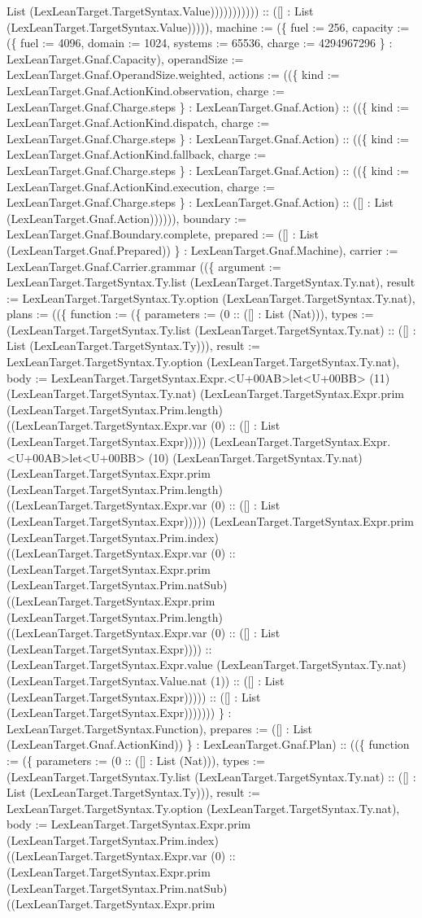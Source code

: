 \documentclass[11pt]{article}
\begin{document}
List (LexLeanTarget.TargetSyntax.Value))))))))))) :: ([] : List (LexLeanTarget.TargetSyntax.Value))))), machine := (\{ fuel := 256, capacity := (\{ fuel := 4096, domain := 1024, systems := 65536, charge := 4294967296 \} : LexLeanTarget.Gnaf.Capacity), operandSize := LexLeanTarget.Gnaf.OperandSize.weighted, actions := ((\{ kind := LexLeanTarget.Gnaf.ActionKind.observation, charge := LexLeanTarget.Gnaf.Charge.steps \} : LexLeanTarget.Gnaf.Action) :: ((\{ kind := LexLeanTarget.Gnaf.ActionKind.dispatch, charge := LexLeanTarget.Gnaf.Charge.steps \} : LexLeanTarget.Gnaf.Action) :: ((\{ kind := LexLeanTarget.Gnaf.ActionKind.fallback, charge := LexLeanTarget.Gnaf.Charge.steps \} : LexLeanTarget.Gnaf.Action) :: ((\{ kind := LexLeanTarget.Gnaf.ActionKind.execution, charge := LexLeanTarget.Gnaf.Charge.steps \} : LexLeanTarget.Gnaf.Action) :: ([] : List (LexLeanTarget.Gnaf.Action)))))), boundary := LexLeanTarget.Gnaf.Boundary.complete, prepared := ([] : List (LexLeanTarget.Gnaf.Prepared)) \} : LexLeanTarget.Gnaf.Machine), carrier := LexLeanTarget.Gnaf.Carrier.grammar ((\{ argument := LexLeanTarget.TargetSyntax.Ty.list (LexLeanTarget.TargetSyntax.Ty.nat), result := LexLeanTarget.TargetSyntax.Ty.option (LexLeanTarget.TargetSyntax.Ty.nat), plans := ((\{ function := (\{ parameters := (0 :: ([] : List (Nat))), types := (LexLeanTarget.TargetSyntax.Ty.list (LexLeanTarget.TargetSyntax.Ty.nat) :: ([] : List (LexLeanTarget.TargetSyntax.Ty))), result := LexLeanTarget.TargetSyntax.Ty.option (LexLeanTarget.TargetSyntax.Ty.nat), body := LexLeanTarget.TargetSyntax.Expr.<U+00AB>let<U+00BB> (11) (LexLeanTarget.TargetSyntax.Ty.nat) (LexLeanTarget.TargetSyntax.Expr.prim (LexLeanTarget.TargetSyntax.Prim.length) ((LexLeanTarget.TargetSyntax.Expr.var (0) :: ([] : List (LexLeanTarget.TargetSyntax.Expr))))) (LexLeanTarget.TargetSyntax.Expr.<U+00AB>let<U+00BB> (10) (LexLeanTarget.TargetSyntax.Ty.nat) (LexLeanTarget.TargetSyntax.Expr.prim (LexLeanTarget.TargetSyntax.Prim.length) ((LexLeanTarget.TargetSyntax.Expr.var (0) :: ([] : List (LexLeanTarget.TargetSyntax.Expr))))) (LexLeanTarget.TargetSyntax.Expr.prim (LexLeanTarget.TargetSyntax.Prim.index) ((LexLeanTarget.TargetSyntax.Expr.var (0) :: (LexLeanTarget.TargetSyntax.Expr.prim (LexLeanTarget.TargetSyntax.Prim.natSub) ((LexLeanTarget.TargetSyntax.Expr.prim (LexLeanTarget.TargetSyntax.Prim.length) ((LexLeanTarget.TargetSyntax.Expr.var (0) :: ([] : List (LexLeanTarget.TargetSyntax.Expr)))) :: (LexLeanTarget.TargetSyntax.Expr.value (LexLeanTarget.TargetSyntax.Ty.nat) (LexLeanTarget.TargetSyntax.Value.nat (1)) :: ([] : List (LexLeanTarget.TargetSyntax.Expr))))) :: ([] : List (LexLeanTarget.TargetSyntax.Expr))))))) \} : LexLeanTarget.TargetSyntax.Function), prepares := ([] : List (LexLeanTarget.Gnaf.ActionKind)) \} : LexLeanTarget.Gnaf.Plan) :: ((\{ function := (\{ parameters := (0 :: ([] : List (Nat))), types := (LexLeanTarget.TargetSyntax.Ty.list (LexLeanTarget.TargetSyntax.Ty.nat) :: ([] : List (LexLeanTarget.TargetSyntax.Ty))), result := LexLeanTarget.TargetSyntax.Ty.option (LexLeanTarget.TargetSyntax.Ty.nat), body := LexLeanTarget.TargetSyntax.Expr.prim (LexLeanTarget.TargetSyntax.Prim.index) ((LexLeanTarget.TargetSyntax.Expr.var (0) :: (LexLeanTarget.TargetSyntax.Expr.prim (LexLeanTarget.TargetSyntax.Prim.natSub) ((LexLeanTarget.TargetSyntax.Expr.prim 
\end{document}
